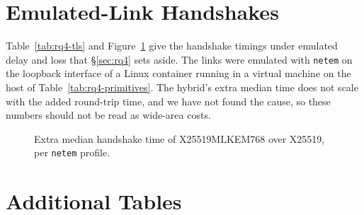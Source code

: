 \section{Emulated-Link Handshakes}
\label{app:netem}

Table~\ref{tab:rq4-tls} and Figure~\ref{fig:rq4-extra} give the handshake
timings under emulated delay and loss that \S\ref{sec:rq4} sets aside. The
links were emulated with \texttt{netem} on the loopback interface of a Linux
container running in a virtual machine on the host of
Table~\ref{tab:rq4-primitives}. The hybrid's extra median time does not scale
with the added round-trip time, and we have not found the cause, so these
numbers should not be read as wide-area costs.

\begin{table}[t]
\centering\small

\caption{Full TLS~1.3 handshake time in the Linux container under each
\texttt{netem} profile, from established TCP connection to usable TLS
connection: medians for the X25519-only, hybrid-only and Go default
clients, the hybrid's extra median time over X25519, and p99.}
\label{tab:rq4-tls}
\end{table}

\begin{figure}[t]
\centering

\caption{Extra median handshake time of X25519MLKEM768 over X25519, per
\texttt{netem} profile.}
\label{fig:rq4-extra}
\end{figure}

\clearpage
\section{Additional Tables}

\begin{table}[!htbp]
\centering\footnotesize\setlength{\tabcolsep}{4pt}

\caption{Hybrid adoption for agencies with at least 
TLS endpoints, with Wilson 95\% intervals.}
\label{tab:rq2-agencies}
\end{table}

\begin{table}[!htbp]
\centering\small

\caption{Quantum-vulnerable algorithms in the  scanned
projects: projects with at least one finding, and findings.}
\label{tab:rq3-algorithms}
\end{table}
